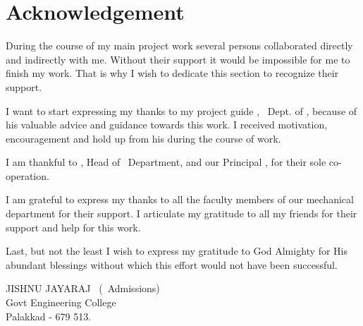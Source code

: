 %
%
%


%
\chapter*{\centering Acknowledgement}
%


\par
\hspace{0.9cm}During the course of my main project work several persons collaborated directly and indirectly with me. Without their support it would be impossible for me to finish my work. That is why I wish to dedicate this section to recognize their support.
\vspace {.2cm}
\par
\hspace{.35cm}I want to start expressing my thanks to my project guide {\bf \vguide}, \vguidedg\ Dept. of \vdept, because of his valuable advice and guidance towards this work. I received motivation, encouragement and hold up from his during the course of work.

\vspace{.2cm}
\par 
\hspace{.35cm}I am thankful to {\bf \vhod}, 
Head of \vdept\  Department, and our Principal {\bf \vprincipal}, for their sole co-operation.

\vspace{0.2cm}
\par
\hspace{0.35cm}I am grateful to express my thanks to all the faculty members of our mechanical department for their support. I articulate my gratitude to all my friends  for their support and help for this work.


\vspace{0.2cm}
\par
\hspace{0.35cm}Last, but not the least I wish to express my gratitude to God Almighty for His abundant blessings without which this effort would not have been successful.\\[.3 cm]



\begin{flushright}
JISHNU JAYARAJ 
\vclass\  (\vadmissionyear\  Admissions)\\
Govt Engineering College \\
Palakkad - 679 513.
\end{flushright}